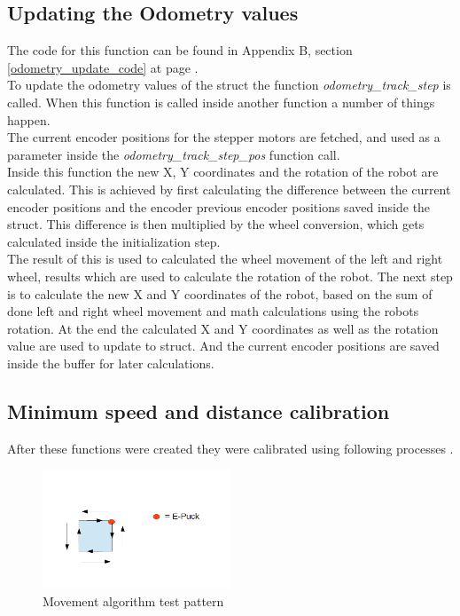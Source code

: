 \begin{flushleft}
\subsection{Updating the Odometry values}
\label{odometry_update_description}
The code for this function can be found in Appendix B, section \ref{odometry_update_code} at page \pageref{odometry_update_code}.\\
To update the odometry values of the struct the function \textit{odometry\_track\_step} is called.
When this function is called inside another function a number of things happen.\\
The current encoder positions for the stepper motors are fetched, 
and used as a parameter inside the \textit{odometry\_track\_step\_pos} function call. \\
Inside this function the new X, Y coordinates and the rotation of the robot are calculated. This is achieved by first calculating the difference between the current encoder positions and the encoder previous encoder positions saved inside the struct. 
This difference is then multiplied by the wheel conversion, which gets calculated inside the initialization step. \\
The result of this is used to calculated the wheel movement of the left and right wheel, results which are used to calculate the rotation of the robot. 
The next step is to calculate the new X and Y coordinates of the robot, based on the sum of done left and right wheel movement  and math calculations using the robots rotation. 
At the end the calculated X and Y coordinates as well as the rotation value are used to update to struct. And the current encoder positions are saved inside the buffer for later calculations. 

\subsection{Minimum speed and distance calibration}
After these functions were created they were calibrated using following processes .\\

\begin{figure}[h]
\centering
\includegraphics[width = 0.5\textwidth]{../../figures/movement_test.png} 
\caption{Movement algorithm test pattern}
\label{movement_test}
\end{figure}


\end{flushleft}
